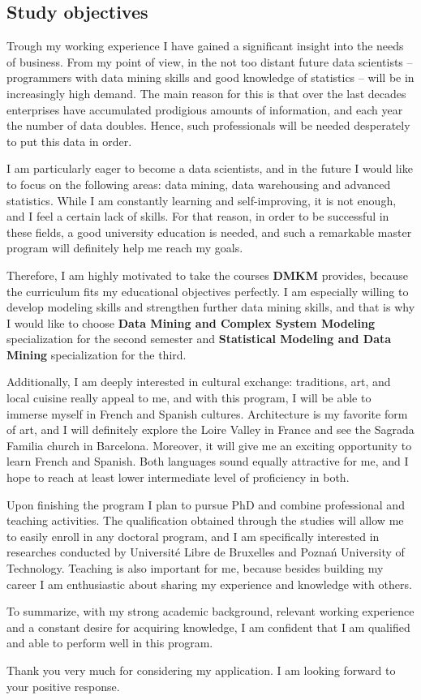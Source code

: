 \documentclass[a4paper,12pt]{article}
\begin{document}
\subsection*{Study objectives}

Trough my working experience I have gained a significant insight into the needs of business. From my point of view, in the not too distant future data scientists -- programmers with data mining skills and good knowledge of statistics -- will be in increasingly high demand. The main reason for this is that over the last decades enterprises have accumulated prodigious amounts of information, and each year the number of data doubles. Hence, such professionals will be needed desperately to put this data in order.

I am particularly eager to become a data scientists, and in the future I would like to focus on the following areas: data mining, data warehousing and advanced statistics. While I am constantly learning and self-improving, it is not enough, and I feel a certain lack of skills. For that reason, in order to be successful in these fields, a good university education is needed, and such a remarkable master program will definitely help me reach my goals.

Therefore, I am highly motivated to take the courses \textbf{DMKM} provides, because the curriculum fits my educational objectives perfectly. I am especially willing to develop modeling skills and strengthen further data mining skills, and that is why I would like to choose \textbf{Data Mining and Complex System Modeling} specialization for the second semester and \textbf{Statistical Modeling and Data Mining} specialization for the third.

Additionally, I am deeply interested in cultural exchange: traditions, art, and local cuisine really appeal to me, and with this program, I will be able to immerse myself in French and Spanish cultures. Architecture is my favorite form of art, and I will definitely explore the Loire Valley in France and see the Sagrada Familia church in Barcelona. Moreover, it will give me an exciting opportunity to learn French and Spanish. Both languages sound equally attractive for me, and I hope to reach at least lower intermediate level of proficiency in both.

Upon finishing the program I plan to pursue PhD and combine professional and teaching activities. The qualification obtained through the studies will allow me to easily enroll in any doctoral program, and I am specifically interested in researches conducted by Universit\'e Libre de Bruxelles and Pozna\'n University of Technology. Teaching is also important for me, because besides building my career I am enthusiastic about sharing my experience and knowledge with others.

To summarize, with my strong academic background, relevant working experience and a constant desire for acquiring knowledge, I am confident that I am qualified and able to perform well in this program.

Thank you very much for considering my application. I am looking forward to your positive response.
\end{document}
